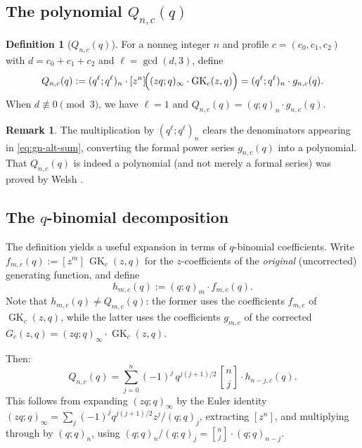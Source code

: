 \documentclass[11pt]{article}
\theoremstyle{plain}
\theoremstyle{definition}
\newtheorem{definition}[theorem]{Definition}
\newtheorem{remark}[theorem]{Remark}
\newcommand{\GK}{\operatorname{GK}}
\newcommand{\qpoch}[2]{(#1;#2)_\infty}
\newcommand{\qpochn}[3]{(#1;#2)_{#3}}
\newcommand{\qbin}[2]{\genfrac{[}{]}{0pt}{}{#1}{#2}}
\begin{document}
\subsection{The polynomial $Q_{n,c}(q)$}

\begin{definition}[$Q_{n,c}(q)$]
\label{def:Q}
For a nonneg integer $n$ and profile $c = (c_0, c_1, c_2)$ with
$d = c_0 + c_1 + c_2$ and $\ell = \gcd(d, 3)$, define
\begin{equation}
  Q_{n,c}(q) := \qpochn{q^\ell}{q^\ell}{n}
  \cdot [z^n]\!\Bigl(\qpoch{zq}{q} \cdot \GK_c(z,q)\Bigr)
  = \qpochn{q^\ell}{q^\ell}{n} \cdot g_{n,c}(q).
  \label{eq:Q-def}
\end{equation}
When $d \not\equiv 0 \pmod{3}$, we have $\ell = 1$ and
$Q_{n,c}(q) = \qpochn{q}{q}{n} \cdot g_{n,c}(q)$.
\end{definition}

\begin{remark}
The multiplication by $\qpochn{q^\ell}{q^\ell}{n}$ clears the denominators
appearing in \eqref{eq:gn-alt-sum}, converting the formal power series
$g_{n,c}(q)$ into a polynomial.
That $Q_{n,c}(q)$ is indeed a polynomial (and not merely a formal series)
was proved by Welsh \cite{Welsh}.
\end{remark}

\subsection{The $q$-binomial decomposition}

The definition yields a useful expansion in terms of $q$-binomial coefficients.
Write $f_{m,c}(q) := [z^m]\,\GK_c(z,q)$ for the $z$-coefficients of the
\emph{original} (uncorrected) generating function, and define
\begin{equation}
  h_{m,c}(q) := \qpochn{q}{q}{m} \cdot f_{m,c}(q).
  \label{eq:hm-def}
\end{equation}
Note that $h_{m,c}(q) \neq Q_{m,c}(q)$: the former uses the coefficients
$f_{m,c}$ of $\GK_c(z,q)$, while the latter uses the coefficients
$g_{m,c}$ of the corrected $G_c(z,q) = \qpoch{zq}{q} \cdot \GK_c(z,q)$.

Then:
\begin{equation}
  Q_{n,c}(q) = \sum_{j=0}^{n} (-1)^j\, q^{j(j+1)/2}\,
  \qbin{n}{j} \cdot h_{n-j,c}(q).
  \label{eq:Q-qbin}
\end{equation}
This follows from expanding $\qpoch{zq}{q}$ by the Euler identity
$\qpoch{zq}{q} = \sum_j (-1)^j q^{j(j+1)/2} z^j / \qpochn{q}{q}{j}$,
extracting $[z^n]$, and multiplying through by $\qpochn{q}{q}{n}$,
using $\qpochn{q}{q}{n}/\qpochn{q}{q}{j} = \qbin{n}{j} \cdot \qpochn{q}{q}{n-j}$.
\end{document}
